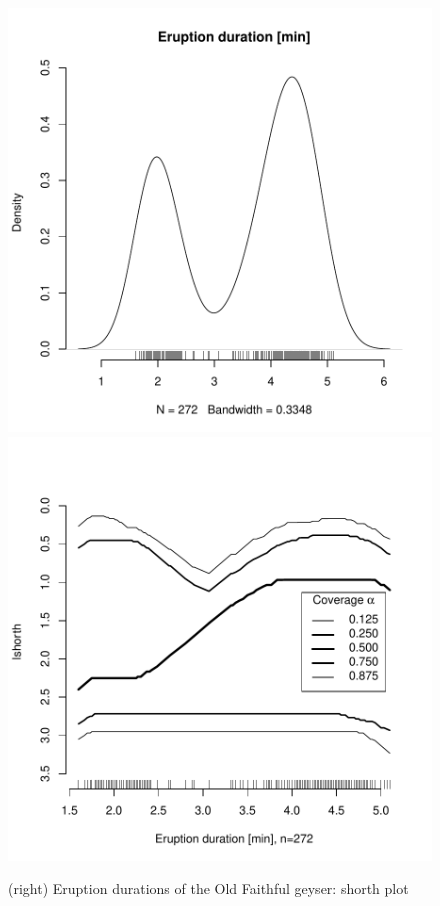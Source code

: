 \documentclass[dvips,12pt,a4paper,twoside]{amsart}
\begin{document}
\begin{figure}[htb]
\includegraphics[width=0.45\linewidth]{TheShorthPlot-Faithfuldens}
\hspace{\fill}%
\includegraphics[width=0.45\linewidth]{TheShorthPlot-Faithful}
\caption{(left) Eruption durations of the Old Faithful geyser:  density estimation (R defaults)}\label{fig:faithfuldens}\caption{(right) Eruption durations of the Old Faithful geyser:  shorth plot}\label{fig:faithful}
\end{figure}
\end{document}
